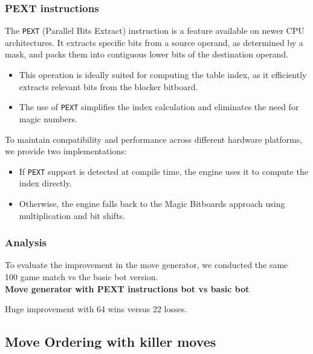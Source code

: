 \subsubsection{PEXT instructions}

The \texttt{PEXT} (Parallel Bits Extract) instruction is a feature available on newer CPU architectures. It extracts specific bits from a source operand, as determined by a mask, and packs them into contiguous lower bits of the destination operand.

\begin{itemize}
  \item This operation is ideally suited for computing the table index, as it efficiently extracts relevant bits from the blocker bitboard.
  \item The use of \texttt{PEXT} simplifies the index calculation and eliminates the need for magic numbers.
\end{itemize}

To maintain compatibility and performance across different hardware platforms, we provide two implementations:
\begin{itemize}
  \item If \texttt{PEXT} support is detected at compile time, the engine uses it to compute the index directly.
  \item Otherwise, the engine falls back to the Magic Bitboards approach using multiplication and bit shifts.
\end{itemize}

\subsubsection{Analysis}

To evaluate the improvement in the move generator, we conducted the same\\
100 game match vs the basic bot version.\\ 

\textbf{Move generator with PEXT instructions bot vs basic bot}\\
\medskip

Huge improvement with 64 wins versus 22 losses.\\


\subsection{Move Ordering with killer moves}

